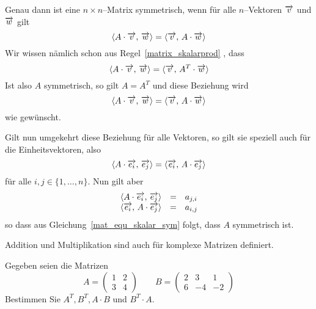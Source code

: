 \begin{notiz}\label{matrix_sym_skalarprod}  
Genau dann ist eine $n \times n$--Matrix symmetrisch, wenn für alle $n$--Vektoren 
$\overrightarrow{v}$ und  $\overrightarrow{w}$ gilt
   	$$ \langle A \cdot  \overrightarrow{v}, \, \overrightarrow{w} \rangle = 
	\langle  \overrightarrow{v}, \,  A \cdot \overrightarrow{w} \rangle $$
Wir wissen nämlich schon aus Regel~\ref{matrix_skalarprod} , dass
  	$$ \langle A \cdot  \overrightarrow{v}, \, \overrightarrow{w} \rangle = 
	\langle  \overrightarrow{v}, \,  A^T \cdot \overrightarrow{w} \rangle $$
Ist also $A$ symmetrisch, so gilt $A = A^T$ und diese Beziehung wird  
   	$$ \langle A \cdot  \overrightarrow{v}, \, \overrightarrow{w} \rangle = 
 	\langle  \overrightarrow{v}, \,  A \cdot \overrightarrow{w} \rangle $$
wie gewünscht. 

Gilt nun umgekehrt diese Beziehung für alle Vektoren, so gilt sie speziell auch für die 
Einheitsvektoren, also
  	\begin{equation}\label{mat_equ_skalar_sym} 
    	\langle A \cdot  \overrightarrow{e_i}, \, \overrightarrow{e_j} \rangle = 
     	\langle  \overrightarrow{e_i}, \,  A \cdot \overrightarrow{e_j} \rangle 
 	\end{equation}
für alle $i, j \in \{1, \ldots, n\}$. Nun gilt aber
  	$$ \begin{array} {l c l}
  	\langle A \cdot  \overrightarrow{e_i}, \, \overrightarrow{e_j} \rangle & = & a_{j,i} \\
   	\langle \overrightarrow{e_i}, \, A \cdot \overrightarrow{e_j} \rangle & = & a_{i,j}
  	\end{array} $$
so dass aus Gleichung~\ref{mat_equ_skalar_sym} folgt, dass $A$ symmetrisch ist.
\end{notiz}

\medbreak

\begin{notiz} Addition und Multiplikation sind auch für komplexe Matrizen definiert.
\end{notiz}

\bigbreak

\begin{aufgabe} Gegeben seien die Matrizen
  	$$ A = \left( \begin{matrix} 1 & 2 \\ 3 & 4 \end{matrix} \right) \qquad 
   	B = \left( \begin{matrix} 2 & 3 & 1 \\ 6 & - 4 & - 2 \end{matrix} \right) $$
Bestimmen Sie $A^T, B^T, A \cdot B$ und $B^T \cdot A$.
\end{aufgabe}

